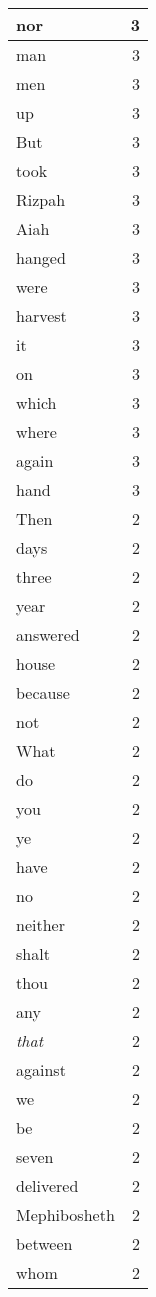 \begin{center}
\begin{longtable}{l|r}
nor & 3 \\ \hline
man & 3 \\ \hline
men & 3 \\ \hline
up & 3 \\ \hline
But & 3 \\ \hline
took & 3 \\ \hline
Rizpah & 3 \\ \hline
Aiah & 3 \\ \hline
hanged & 3 \\ \hline
were & 3 \\ \hline
harvest & 3 \\ \hline
it & 3 \\ \hline
on & 3 \\ \hline
which & 3 \\ \hline
where & 3 \\ \hline
again & 3 \\ \hline
hand & 3 \\ \hline
Then & 2 \\ \hline
days & 2 \\ \hline
three & 2 \\ \hline
year & 2 \\ \hline
answered & 2 \\ \hline
house & 2 \\ \hline
because & 2 \\ \hline
not & 2 \\ \hline
What & 2 \\ \hline
do & 2 \\ \hline
you & 2 \\ \hline
ye & 2 \\ \hline
have & 2 \\ \hline
no & 2 \\ \hline
neither & 2 \\ \hline
shalt & 2 \\ \hline
thou & 2 \\ \hline
any & 2 \\ \hline
\emph{that} & 2 \\ \hline
against & 2 \\ \hline
we & 2 \\ \hline
be & 2 \\ \hline
seven & 2 \\ \hline
delivered & 2 \\ \hline
Mephibosheth & 2 \\ \hline
between & 2 \\ \hline
whom & 2 \\ \hline

\end{longtable}
\end{center}
